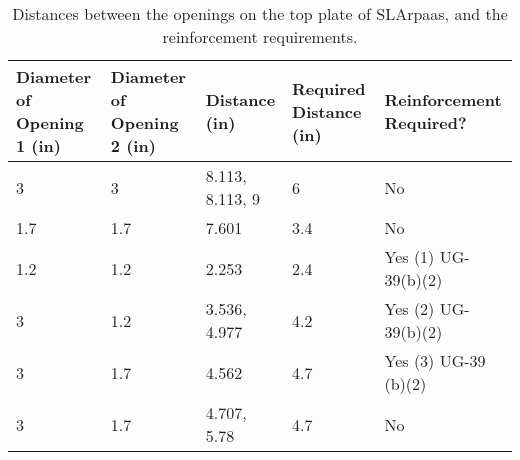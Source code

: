 \begin{table}[h]
\begin{center}
\tabcolsep=10pt
\begin{tabular}{m{2cm}|m{2cm}|l|m{2cm}|m{2.5cm}}
\hline
\hline
Diameter of Opening 1 (in) & 
Diameter of Opening 2 (in) & Distance (in) & 
Required Distance (in) & 
Reinforcement Required? \\
\hline
3 & 3 & 8.113, 8.113, 9 & 6 & No \\
1.7 & 1.7 & 7.601 & 3.4 & No \\
1.2 & 1.2 & 2.253 & 2.4 & Yes (1) UG-39(b)(2) \\
3 & 1.2 & 3.536, 4.977 & 4.2 & Yes (2) UG-39(b)(2) \\
3 & 1.7 & 4.562 & 4.7 & Yes (3) UG-39 (b)(2) \\
3 & 1.7 & 4.707, 5.78 & 4.7 & No \\
\hline
\hline
\end{tabular}
\caption{Distances between the openings on the top plate of
SLArpaas, and the reinforcement requirements.}
\label{table:opening_dist}
\end{center}
\end{table}
